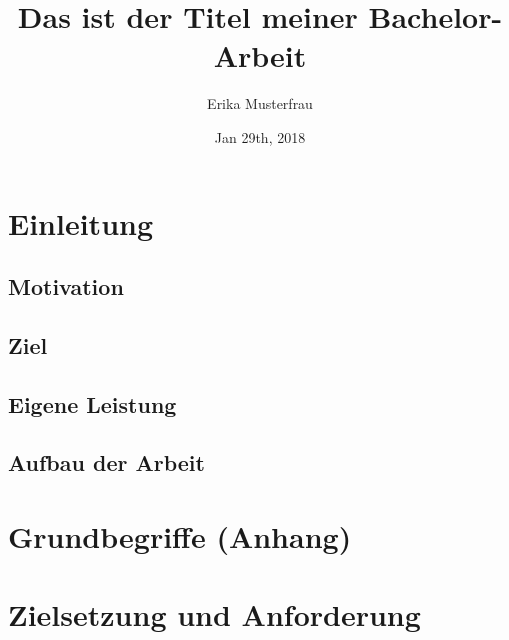 \documentclass[11pt,twoside,a4paper,titlepage]{article}
\title{{Das ist der Titel meiner Bachelor-Arbeit}}
\author{Erika Musterfrau}
\date{Jan 29th, 2018}
\begin{document}
\setlength{\parindent}{0pt}



\pagestyle{fancy}



\newpage



\tableofcontents

\fancyhead[RO,LE]{\nouppercase{\leftmark}}
\fancyfoot[RO,LE]{\thepage}

\renewcommand{\headrulewidth}{0.5pt}

\setcounter{page}{1}

\newpage


\section{Einleitung}

\subsection{Motivation}

\subsection{Ziel}

\subsection{Eigene Leistung}

\subsection{Aufbau der Arbeit}

\section{Grundbegriffe (Anhang)}

\section{Zielsetzung und Anforderung}
\end{document}
